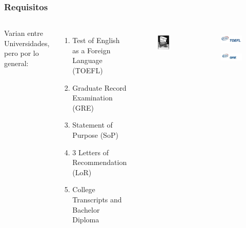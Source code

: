 \documentclass[10pt]{beamer}
\begin{document}
\begin{frame}
\frametitle{Requisitos}

\begin{columns}[t]

Varian entre Universidades, pero por lo general:

\begin{enumerate}
\item{Test of English as a Foreign Language (TOEFL)}
\item{Graduate Record Examination (GRE)}
\item{Statement of Purpose (SoP)}
\item{3 Letters of Recommendation (LoR)}
\item{College Transcripts and Bachelor Diploma}
\end{enumerate}

\begin{figure}
\includegraphics[scale=0.3]{figures/SoP_Logo.jpg} 	
	          \label{fig:SoPLogo}
	          \end{figure}
\begin{figure}[h]
			\centering

			  \includegraphics[scale=0.3]{figures/TOEFL_Logo.jpg} 
	          \label{fig:TOEFLLogo}             

	          \includegraphics[scale=0.6]{figures/GRE_Logo.jpg} 	
	          \label{fig:GRELogo}

            \label{fig:Requirements}
	\end{figure} 

\end{columns}

\end{frame}
\end{document}

